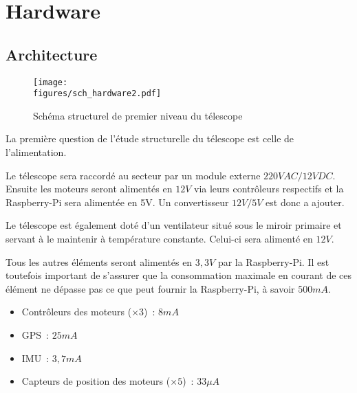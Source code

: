 \chapter{Hardware}


\section{Architecture}

\begin{figure}[H]
    \centering
    \texttt{[image: \\figures/sch\_hardware2.pdf]}
    \decoRule
    \caption[
    Schéma structurel de premier niveau du télescope]{
    Schéma structurel de premier niveau du télescope}
    \label{fig:Schéma structurel de premier niveau du télescope}
    \end{figure}

\vspace{1cm}

La première question de l'étude structurelle du télescope est celle de l'alimentation.

Le télescope sera raccordé au secteur par un module externe $220VAC / 12VDC$. Ensuite les moteurs seront alimentés en $12V$ via leurs contrôleurs respectifs et la Raspberry-Pi sera alimentée en 5V. Un convertisseur $12V / 5V$ est donc a ajouter.

Le télescope est également doté d'un ventilateur situé sous le miroir primaire et servant à le maintenir à température constante. Celui-ci sera alimenté en $12V$.

\vspace{1cm}

Tous les autres éléments seront alimentés en $3,3V$ par la Raspberry-Pi. Il est toutefois important de s'assurer que la consommation maximale en courant de ces élément ne dépasse pas ce que peut fournir la Raspberry-Pi, à savoir $500mA$.
\begin{itemize}[label=$\bullet$]
	\item Contrôleurs des moteurs ($\times 3$)~: $8mA$
	\item GPS~: $25mA$
	\item IMU~: $3,7mA$
	\item Capteurs de position des moteurs ($\times 5$)~: $33\mu A$
	\end{itemize}

\vspace{1cm}

